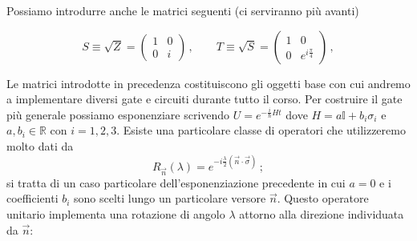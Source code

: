\noindent Possiamo introdurre anche le matrici seguenti (ci serviranno più avanti)

\begin{equation}\label{S_T_matrices}
    S \equiv \sqrt{Z} =
\begin{pmatrix}
    1 & 0 \\ 0 & i
\end{pmatrix} \, , \qquad 
T \equiv \sqrt{S} =
\begin{pmatrix}
    1 & 0 \\ 0 & e^{i \frac{\pi}{4}}
\end{pmatrix} \, ,
\end{equation}

\noindent Le matrici introdotte in precedenza costituiscono gli oggetti base con cui andremo a implementare diversi gate e circuiti durante tutto il corso. Per costruire il gate più generale possiamo esponenziare scrivendo $U = e^{-\frac{i}{\hbar} H t}$ dove $H = a \mathbb{I} + b_i \sigma_i$ e $a, b_i \in \mathbb{R}$ con $i = 1,2,3$. Esiste una particolare classe di operatori che utilizzeremo molto dati da
\begin{equation*}
    R_{\vec{n}}(\lambda) = e^{-i \frac{\lambda}{2} (\vec n \cdot \vec \sigma)} \, ;
\end{equation*}
si tratta di un caso particolare dell'esponenziazione precedente in cui $a = 0$ e i coefficienti $b_i$ sono scelti lungo un particolare versore $\vec n$. Questo operatore unitario implementa una rotazione di angolo $\lambda$ attorno alla direzione individuata da $\vec n$:

